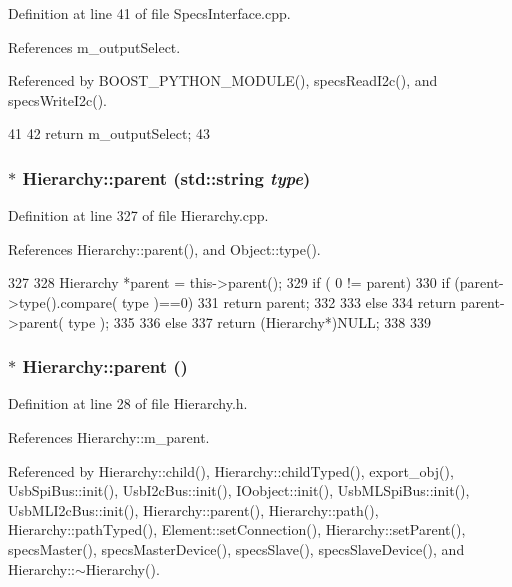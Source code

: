 Definition at line 41 of file SpecsInterface.cpp.

References m\_\-outputSelect.

Referenced by BOOST\_\-PYTHON\_\-MODULE(), specsReadI2c(), and specsWriteI2c().


\begin{DoxyCode}
41                                            {
42     return m_outputSelect;
43 }
\end{DoxyCode}
\hypertarget{classHierarchy_ad550588733bf75ac5c0fcfd7c8fd11a6}{
\subsubsection[{parent}]{ $\ast$ Hierarchy::parent (std::string {\em type})}}
\label{classHierarchy_ad550588733bf75ac5c0fcfd7c8fd11a6}


Definition at line 327 of file Hierarchy.cpp.

References Hierarchy::parent(), and Object::type().


\begin{DoxyCode}
327                                             {
328   Hierarchy *parent = this->parent();
329   if ( 0 != parent){
330     if (parent->type().compare( type )==0) {
331       return parent;
332     }
333     else
334       return parent->parent( type );
335   }
336   else {
337     return (Hierarchy*)NULL;
338   }
339 }
\end{DoxyCode}
\hypertarget{classHierarchy_a1c7bec8257e717f9c1465e06ebf845fc}{
\subsubsection[{parent}]{$\ast$ Hierarchy::parent ()}}
\label{classHierarchy_a1c7bec8257e717f9c1465e06ebf845fc}


Definition at line 28 of file Hierarchy.h.

References Hierarchy::m\_\-parent.

Referenced by Hierarchy::child(), Hierarchy::childTyped(), export\_\-obj(), UsbSpiBus::init(), UsbI2cBus::init(), IOobject::init(), UsbMLSpiBus::init(), UsbMLI2cBus::init(), Hierarchy::parent(), Hierarchy::path(), Hierarchy::pathTyped(), Element::setConnection(), Hierarchy::setParent(), specsMaster(), specsMasterDevice(), specsSlave(), specsSlaveDevice(), and Hierarchy::$\sim$Hierarchy().


